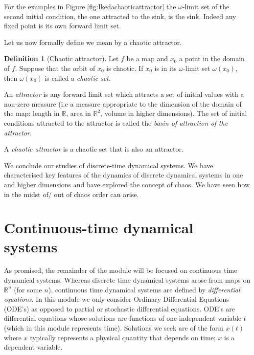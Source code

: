 \documentclass[
  a4paper,
  oneside,
  final]{krantz}
\newcommand{\R}{\mathbb{R}}
\theoremstyle{definition}
\newtheorem{definition}{Definition}[chapter]
\theoremstyle{definition}
\theoremstyle{definition}
\theoremstyle{definition}
\theoremstyle{remark}
\begin{document}
For the examples in Figure \ref{fig:Ikedachaoticattractor} the \(\omega\)-limit set of the second initial condition, the one attracted to the sink, is the sink. Indeed any fixed point is its own forward limit set.

Let us now formally define we mean by a chaotic attractor.

\begin{definition}[Chaotic attractor]
\protect\hypertarget{def:chaotic-attractor}{}\label{def:chaotic-attractor}Let \(f\) be a map and \(x_0\) a point in the domain of \(f\). Suppose that the orbit of \(x_0\) is chaotic. If \(x_0\) is in its \(\omega\)-limit set \(\omega(x_0)\), then \(\omega(x_0)\) is called a \emph{chaotic set}.

An \emph{attractor} is any forward limit set which attracts a set of initial values with a non-zero measure (i.e a measure appropriate to the dimension of the domain of the map: length in \(\R\), area in \(\R^2\), volume in higher dimensions). The set of initial conditions attracted to the attractor is called the \emph{basin of attraction of the attractor}.

A \emph{chaotic attractor} is a chaotic set that is also an attractor.
\end{definition}

We conclude our studies of discrete-time dynamical systems. We have characterised key features of the dynamics of discrete dynamical systems in one and higher dimensions and have explored the concept of chaos. We have seen how in the midst of/ out of chaos order can arise.

\hypertarget{continuous-time-dynamical-systems-section}{%
\section{Continuous-time dynamical systems}\label{continuous-time-dynamical-systems-section}}

As promised, the remainder of the module will be focused on continuous time dynamical systems. Whereas discrete time dynamical systems arose from maps on \(\R^{n}\) (for some \(n\)), continuous time dynamical systems are defined by \emph{differential equations}. In this module we only consider Ordinary Differential Equations (ODE's) as opposed to partial or stochastic differential equations. ODE's are differential equations whose solutions are functions of one independent variable \(t\) (which in this module represents time). Solutions we seek are of the form \(x(t)\) where \(x\) typically represents a physical quantity that depends on time; \(x\) is a dependent variable.
\end{document}
